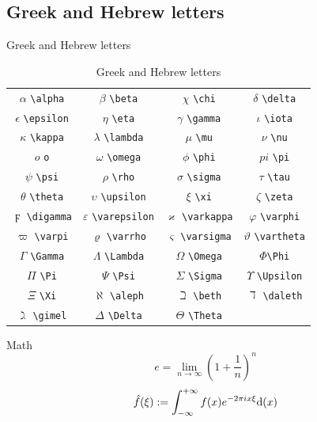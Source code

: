 \documentclass[10pt,UTF8]{ctexbeamer}
\begin{document}
\subsection{Greek and Hebrew letters}
\begin{frame}[fragile]{Greek and Hebrew letters}
	\begin{table}
		\centering
		\caption{Greek and Hebrew letters}
		\begin{tabular}{cccc}
		$\alpha$ \verb|\alpha| & $\beta$ \verb|\beta| & $\chi$ \verb|\chi| & $\delta$ \verb|\delta| \\
		$\epsilon$ \verb|\epsilon| &
		 $\eta$ \verb|\eta| & $\gamma$ \verb|\gamma| & $\iota$ \verb|\iota| \\
		$\kappa$ \verb|\kappa| & $\lambda$ \verb|\lambda| &
		  $\mu$ \verb|\mu| & $\nu$ \verb|\nu| \\
		$o$ \verb|o| & $\omega$ \verb|\omega| & $\phi$ \verb|\phi| &
		   $pi$ \verb|\pi| \\
		$\psi$ \verb|\psi| & $\rho$ \verb|\rho| & $\sigma$ \verb|\sigma| & $\tau$ \verb|\tau| \\ 
		$\theta$ \verb|\theta| & $\upsilon$ \verb|\upsilon| & $\xi$ \verb|\xi| & $\zeta$ \verb|\zeta| \\
		$\digamma$ \verb|\digamma| & $\varepsilon$ \verb|\varepsilon| & $\varkappa$ \verb|\varkappa| & $\varphi$ \verb|\varphi| \\
		$\varpi$ \verb|\varpi| & $\varrho$ \verb|\varrho| &
		$\varsigma$ \verb|\varsigma| & $\vartheta$ \verb|\vartheta| \\
		$\Gamma$ \verb|\Gamma| & $\Lambda$ \verb|\Lambda| & $\Omega$ \verb|\Omega| & $\Phi$\verb|\Phi| \\
		$\Pi$ \verb|\Pi| & $\Psi$ \verb|\Psi| & $\Sigma$ \verb|\Sigma| & $\Upsilon$ \verb|\Upsilon| \\
		$\Xi$ \verb|\Xi| & $\aleph$ \verb|\aleph| & $\beth$ \verb|\beth| & $\daleth$ \verb|\daleth| \\
		$\gimel$ \verb|\gimel| & $\Delta$ \verb|\Delta|	& $\Theta$ \verb|\Theta| & \\
	\end{tabular}
	\end{table}
\end{frame}

\begin{frame}{Math}
	\begin{equation}
    e = \lim_{n\to \infty} \left(1 + \frac{1}{n}\right)^n 
	\end{equation}
	\begin{equation}
    \hat{f}(\xi):=\int_{-\infty}^{+\infty}f(x)e^{-2\pi i x \xi}{\rm d}(x)
	\end{equation}
\end{frame}
\end{document}
